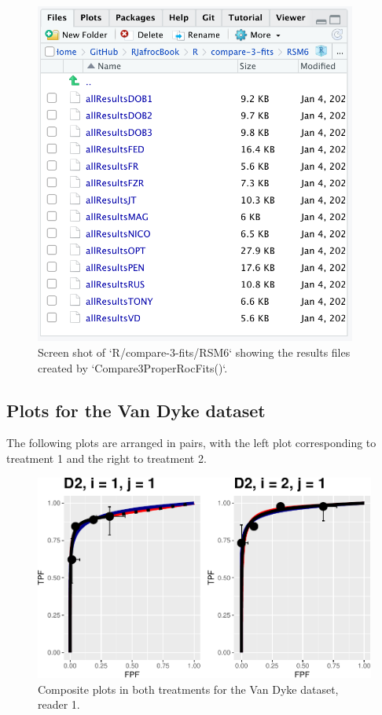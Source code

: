 \documentclass[
]{book}
\begin{document}
\begin{figure}

{\centering \includegraphics[width=300pt]{images/compare-3-fits/RSM6} 

}

\caption{Screen shot of `R/compare-3-fits/RSM6` showing the results files created by  `Compare3ProperRocFits()`.}\label{fig:rsm-3-fits-all-results-rsm6}
\end{figure}

\hypertarget{rsm-3-fits-representative-plots-van-dyke}{%
\subsection{Plots for the Van Dyke dataset}\label{rsm-3-fits-representative-plots-van-dyke}}

The following plots are arranged in pairs, with the left plot corresponding to treatment 1 and the right to treatment 2.

\begin{figure}
\centering
\includegraphics{12-rsm-3-fits_files/figure-latex/rsm-3-fits-plots-vd-1-1-1.pdf}
\caption{\label{fig:rsm-3-fits-plots-vd-1-1}Composite plots in both treatments for the Van Dyke dataset, reader 1.}
\end{figure}
\end{document}
